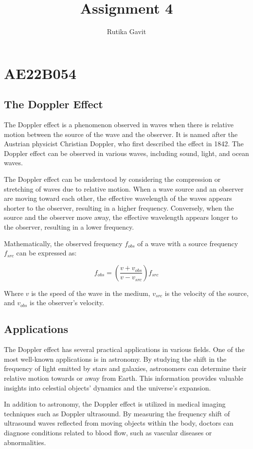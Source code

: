 \documentclass{article}
\title{Assignment 4}
\author{Rutika Gavit}
\date{}
\begin{document}
\maketitle
\section*{AE22B054}
\subsection*{The Doppler Effect}
The Doppler effect is a phenomenon observed in waves when there is relative motion between the source of the wave and the observer. It is named after the Austrian physicist Christian Doppler, who first described the effect in 1842. The Doppler effect can be observed in various waves, including sound, light, and ocean waves.

The Doppler effect can be understood by considering the compression or stretching of waves due to relative motion. When a wave source and an observer are moving toward each other, the effective wavelength of the waves appears shorter to the observer, resulting in a higher frequency. Conversely, when the source and the observer move away, the effective wavelength appears longer to the observer, resulting in a lower frequency.

Mathematically, the observed frequency $f_{obs}$ of a wave with a source frequency $f_{src}$ can be expressed as:

\begin{equation}
    f_{obs} = \left( \frac{v + v_{obs}}{v - v_{src}} \right) f_{src}
\end{equation}

Where $v$ is the speed of the wave in the medium, $v_{src}$ is the velocity of the source, and $v_{obs}$ is the observer's velocity.
\cite{doppler1842}
\subsection*{Applications}
The Doppler effect has several practical applications in various fields. One of the most well-known applications is in astronomy. By studying the shift in the frequency of light emitted by stars and galaxies, astronomers can determine their relative motion towards or away from Earth. This information provides valuable insights into celestial objects' dynamics and the universe's expansion.

In addition to astronomy, the Doppler effect is utilized in medical imaging techniques such as Doppler ultrasound. By measuring the frequency shift of ultrasound waves reflected from moving objects within the body, doctors can diagnose conditions related to blood flow, such as vascular diseases or abnormalities.
\end{document}
